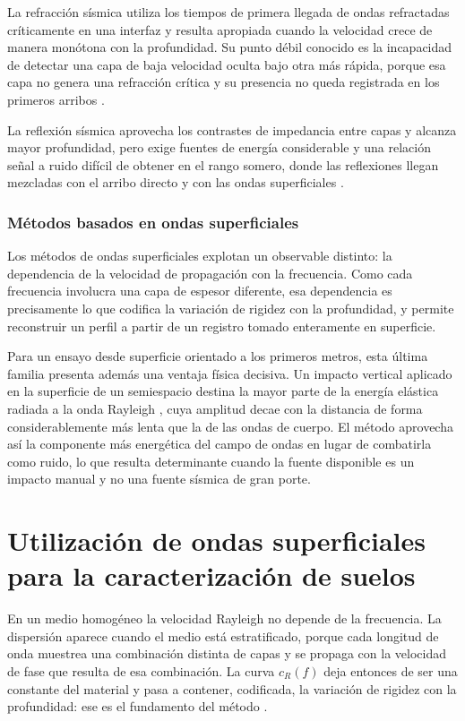 La refracción sísmica utiliza los tiempos de primera llegada de ondas refractadas críticamente en una interfaz y resulta apropiada cuando la velocidad crece de manera monótona con la profundidad. Su punto débil conocido es la incapacidad de detectar una capa de baja velocidad oculta bajo otra más rápida, porque esa capa no genera una refracción crítica y su presencia no queda registrada en los primeros arribos .

La reflexión sísmica aprovecha los contrastes de impedancia entre capas y alcanza mayor profundidad, pero exige fuentes de energía considerable y una relación señal a ruido difícil de obtener en el rango somero, donde las reflexiones llegan mezcladas con el arribo directo y con las ondas superficiales .

\subsubsection{Métodos basados en ondas superficiales}

Los métodos de ondas superficiales explotan un observable distinto: la dependencia de la velocidad de propagación con la frecuencia. Como cada frecuencia involucra una capa de espesor diferente, esa dependencia es precisamente lo que codifica la variación de rigidez con la profundidad, y permite reconstruir un perfil a partir de un registro tomado enteramente en superficie.

Para un ensayo desde superficie orientado a los primeros metros, esta última familia presenta además una ventaja física decisiva. Un impacto vertical aplicado en la superficie de un semiespacio destina la mayor parte de la energía elástica radiada a la onda Rayleigh \citep{Foti2014}, cuya amplitud decae con la distancia de forma considerablemente más lenta que la de las ondas de cuerpo. El método aprovecha así la componente más energética del campo de ondas en lugar de combatirla como ruido, lo que resulta determinante cuando la fuente disponible es un impacto manual y no una fuente sísmica de gran porte.

\section{Utilización de ondas superficiales para la caracterización de suelos}
\label{sec:uso-superficiales}

En un medio homogéneo la velocidad Rayleigh no depende de la frecuencia. La dispersión aparece cuando el medio está estratificado, porque cada longitud de onda muestrea una combinación distinta de capas y se propaga con la velocidad de fase que resulta de esa combinación. La curva $c_R(f)$ deja entonces de ser una constante del material y pasa a contener, codificada, la variación de rigidez con la profundidad: ese es el fundamento del método .

